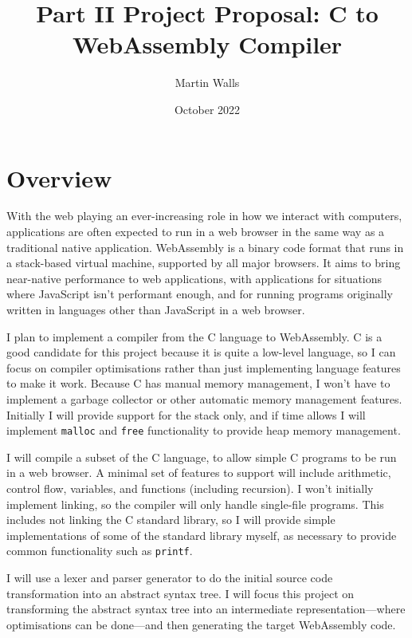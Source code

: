 

\pagestyle{fancy}
\fancyfoot[C]{\thepage\ / \pageref{LastPage}}

\title{Part II Project Proposal: C to WebAssembly Compiler}
\author{Martin Walls}
\date{October 2022}



\maketitle

\section*{Overview}

With the web playing an ever-increasing role in how we interact with computers, applications are often expected to run in a web browser in the same way as a traditional native application. WebAssembly is a binary code format that runs in a stack-based virtual machine, supported by all major browsers. It aims to bring near-native performance to web applications, with applications for situations where JavaScript isn't performant enough, and for running programs originally written in languages other than JavaScript in a web browser.

I plan to implement a compiler from the C language to WebAssembly.
C is a good candidate for this project because it is quite a low-level language, so I can focus on compiler optimisations rather than just implementing language features to make it work. Because C has manual memory management, I won't have to implement a garbage collector or other automatic memory management features.
Initially I will provide support for the stack only, and if time allows I will implement \texttt{malloc} and \texttt{free} functionality to provide heap memory management.

I will compile a subset of the C language, to allow simple C programs to be run in a web browser. A minimal set of features to support will include arithmetic, control flow, variables, and functions (including recursion).
I won't initially implement linking, so the compiler will only handle single-file programs. This includes not linking the C standard library, so I will provide simple implementations of some of the standard library myself, as necessary to provide common functionality such as \texttt{printf}.

I will use a lexer and parser generator to do the initial source code transformation into an abstract syntax tree.
I will focus this project on transforming the abstract syntax tree into an intermediate representation---where optimisations can be done---and then generating the target WebAssembly code.

